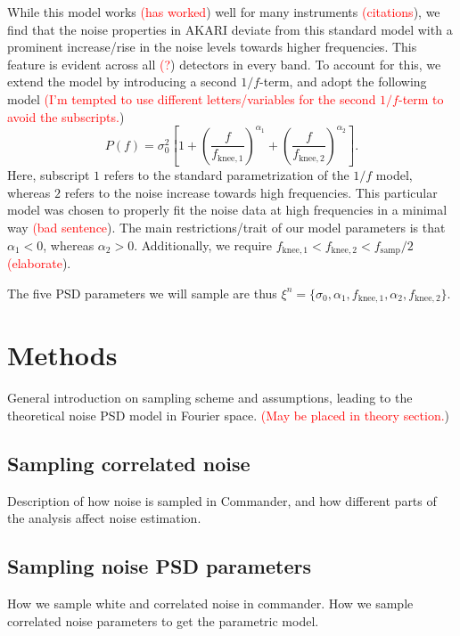 \documentclass{aa}
\newcommand{\pnote}[1]{\textcolor{red}{(#1})}
\newcommand{\fkneei}[1][1]{f_{\mathrm{knee},#1}}
\newcommand{\slopei}[1][1]{\alpha_{#1}}
\newcommand{\pclosed}[1]{\left(#1\right)}
\newcommand{\bclosed}[1]{\left[#1\right]}
\begin{document}
While this model works \pnote{has worked} well for many instruments \pnote{citations}, we find that the noise properties in AKARI deviate from this standard model with a prominent increase/rise in the noise levels towards higher frequencies. This feature is evident across all \pnote{?} detectors in every band. To account for this, we extend the model by introducing a second $1/f$-term, and adopt the following model \pnote{I'm tempted to use different letters/variables for the second $1/f$-term to avoid the subscripts.}
\begin{equation}
    \label{eq:psd_2oof_model}
    P(f) = \sigma_0^2 \bclosed{1 + \pclosed{\frac{f}{\fkneei[1]}}^{\slopei[1]} + \pclosed{\frac{f}{\fkneei[2]}}^{\slopei[2]}}.
\end{equation}
Here, subscript $1$ refers to the standard parametrization of the $1/f$ model, whereas $2$ refers to the noise increase towards high frequencies. This particular model was chosen to properly fit the noise data at high frequencies in a minimal way \pnote{bad sentence}. 
The main restrictions/trait of our model parameters is that $\slopei[1]<0$, whereas $\slopei[2]>0$. Additionally, we require $\fkneei[1]<\fkneei[2]<f_{\mathrm{samp}}/2$ \pnote{elaborate}.

The five PSD parameters we will sample are thus $\xi^n = \{\sigma_0,\alpha_1,\fkneei[1],\alpha_2,\fkneei[2]\}$.

\section{Methods}
\label{sec:methods}
General introduction on sampling scheme and assumptions, leading to the theoretical noise PSD model in Fourier space. \pnote{May be placed in theory section.}

\subsection{Sampling correlated noise}
\label{sec:}
Description of how noise is sampled in Commander, and how different parts of the analysis affect noise estimation. 

\subsection{Sampling noise PSD parameters}
How we sample white and correlated noise in commander.
How we sample correlated noise parameters to get the parametric model. 
\end{document}
